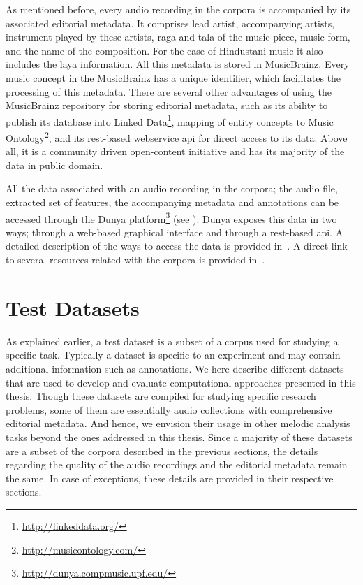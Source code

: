 As mentioned before, every audio recording in the corpora is accompanied by its associated editorial metadata. It comprises lead artist, accompanying artists, instrument played by these artists, \gls{raga} and \gls{tala} of the music piece, music form, and the name of the composition. For the case of Hindustani music it also includes the \gls{laya} information. All this metadata is stored in MusicBrainz. Every music concept in the MusicBrainz has a unique identifier, which facilitates the processing of this metadata. There are several other advantages of using the MusicBrainz repository for storing editorial metadata, such as its ability to publish its database into Linked Data\footnote{\url{http://linkeddata.org/}}, mapping of entity concepts to Music Ontology\footnote{\url{http://musicontology.com/}}, and its \acrshort{rest}-based webservice \acrshort{api} for direct access to its data. Above all, it is a community driven open-content initiative and has its majority of the data in public domain.

All the data associated with an audio recording in the corpora; the audio file, extracted set of features, the accompanying metadata and annotations can be accessed through the Dunya platform\footnote{\url{http://dunya.compmusic.upf.edu/}} (see ). Dunya exposes this data in two ways; through a web-based graphical interface and through a \acrshort{rest}-based \acrshort{api}. A detailed description of the ways to access the data is provided in~. A direct link to several resources related with the corpora is provided in~.


\section{Test Datasets}
\label{sec:corpus_test_datasets}

As explained earlier, a test dataset is a subset of a corpus used for studying a specific task. Typically a dataset is specific to an experiment and may contain additional information such as annotations. We here describe different datasets that are used to develop and evaluate computational approaches presented in this thesis. Though these datasets are compiled for studying specific research problems, some of them are essentially audio collections with comprehensive editorial metadata. And hence, we envision their usage in other melodic analysis tasks beyond the ones addressed in this thesis. Since a majority of these datasets are a subset of the corpora described in the previous sections, the details regarding the quality of the audio recordings and the editorial metadata remain the same. In case of exceptions, these details are provided in their respective sections. 


